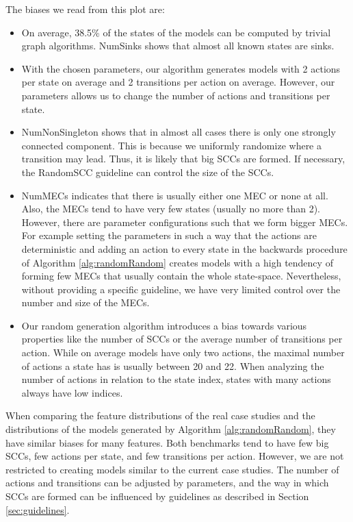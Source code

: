 The biases we read from this plot are:
\begin{itemize} \label{insights:randomRandom}
    \item On average, 38.5\% of the states of the models can be computed by trivial graph algorithms. NumSinks shows that almost all known states are sinks.
    \item With the chosen parameters, our algorithm generates models with 2 actions per state on average
     and 2 transitions per action on average.     
     However, our parameters allows us to change the number of actions and transitions per state.
    \item NumNonSingleton shows that in almost all cases there is only one strongly connected component.
        This is because we uniformly randomize where a transition may lead. Thus, it is likely that big SCCs are formed. 
        If necessary, the RandomSCC guideline can control the size of the SCCs.
    \item NumMECs indicates that there is usually either one MEC or none at all. Also, the MECs tend to have very few states (usually no more than 2).
    However, there are parameter configurations such that we form bigger MECs. For example setting the parameters in such a way that the actions are deterministic
    and adding an action to every state in the backwards procedure of Algorithm \ref{alg:randomRandom} creates models with a high tendency of forming few MECs that usually contain the whole state-space.
    Nevertheless, without providing a specific guideline, we have very limited control over the number and size of the MECs.
    \item Our random generation algorithm introduces a bias towards various properties like the number of SCCs or the average number of transitions per action.
    While on average models have only two actions, the maximal number of actions a state has is usually between 20 and 22.
    When analyzing the number of actions in relation to the state index, states with many actions always have low indices.
\end{itemize}

When comparing the feature distributions of the real case studies and the distributions of the models generated by Algorithm \ref{alg:randomRandom},
they have similar biases for many features. Both benchmarks tend to have few big SCCs, few actions per state, and few transitions per action.
However, we are not restricted to creating models similar to the current case studies. The number of actions and transitions can be adjusted by parameters,
and the way in which SCCs are formed can be influenced by guidelines as described in Section \ref{sec:guidelines}.

